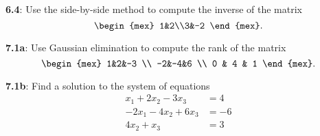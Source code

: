 \documentclass[pal,wide,12pt]{pajarticle}
\newenvironment{problem}[1]{\noindent\textbf{#1}:}{\newpage}
\begin{document}
\begin{problem}{6.4}
	Use the side-by-side method to compute the inverse of the matrix 
	\[ \begin{mex} 1&2\\3&-2 \end{mex}. \]
\end{problem}

\begin{problem}{7.1a}
	Use Gaussian elimination to compute the rank of the matrix
	\[ \begin{mex} 1&2&-3 \\ -2&-4&6 \\ 0 & 4 & 1 \end{mex}. \]	
\end{problem}

\begin{problem}{7.1b}
	Find a solution to the system of equations
	\begin{align*}
		x_1 + 2x_2 - 3x_3 &= 4 \\
		-2x_1 - 4x_2 + 6x_3 &= -6 \\
		4x_2 + x_3 &= 3	
	\end{align*}
\end{problem}
\end{document}
